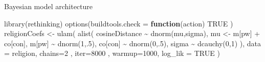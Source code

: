 \documentclass[
  10pt,
  ignorenonframetext,
  x11names, dvipsnames, bibspacing,natbib, table]{beamer}
\newenvironment{Shaded}{\begin{snugshade}}{\end{snugshade}}
\newcommand{\AttributeTok}[1]{\textcolor[rgb]{0.77,0.63,0.00}{#1}}
\newcommand{\ConstantTok}[1]{\textcolor[rgb]{0.00,0.00,0.00}{#1}}
\newcommand{\ControlFlowTok}[1]{\textcolor[rgb]{0.13,0.29,0.53}{\textbf{#1}}}
\newcommand{\DecValTok}[1]{\textcolor[rgb]{0.00,0.00,0.81}{#1}}
\newcommand{\FunctionTok}[1]{\textcolor[rgb]{0.00,0.00,0.00}{#1}}
\newcommand{\NormalTok}[1]{#1}
\newcommand{\OtherTok}[1]{\textcolor[rgb]{0.56,0.35,0.01}{#1}}
\newcommand{\SpecialCharTok}[1]{\textcolor[rgb]{0.00,0.00,0.00}{#1}}
\begin{document}
\begin{frame}[fragile]{Bayesian model architecture}
\protect\hypertarget{bayesian-model-architecture-1}{}
\vspace{1mm}
\footnotesize

\begin{Shaded}
\begin{Highlighting}[]
\FunctionTok{library}\NormalTok{(rethinking)}
\FunctionTok{options}\NormalTok{(}\AttributeTok{buildtools.check =} \ControlFlowTok{function}\NormalTok{(action) }\ConstantTok{TRUE}\NormalTok{ )}
\NormalTok{religionCoefs }\OtherTok{\textless{}{-}} \FunctionTok{ulam}\NormalTok{(}
  \FunctionTok{alist}\NormalTok{(}
\NormalTok{    cosineDistance }\SpecialCharTok{\textasciitilde{}} \FunctionTok{dnorm}\NormalTok{(mu,sigma),}
\NormalTok{    mu }\OtherTok{\textless{}{-}}\NormalTok{ m[pw] }\SpecialCharTok{+}\NormalTok{ co[con],}
\NormalTok{    m[pw] }\SpecialCharTok{\textasciitilde{}} \FunctionTok{dnorm}\NormalTok{(}\DecValTok{1}\NormalTok{,.}\DecValTok{5}\NormalTok{),}
\NormalTok{    co[con] }\SpecialCharTok{\textasciitilde{}} \FunctionTok{dnorm}\NormalTok{(}\DecValTok{0}\NormalTok{,.}\DecValTok{5}\NormalTok{),}
\NormalTok{    sigma }\SpecialCharTok{\textasciitilde{}} \FunctionTok{dcauchy}\NormalTok{(}\DecValTok{0}\NormalTok{,}\DecValTok{1}\NormalTok{)}
\NormalTok{  ),}
  \AttributeTok{data =}\NormalTok{ religion,}
  \AttributeTok{chains=}\DecValTok{2}\NormalTok{ , }\AttributeTok{iter=}\DecValTok{8000}\NormalTok{ , }\AttributeTok{warmup=}\DecValTok{1000}\NormalTok{, }
  \AttributeTok{log\_lik =} \ConstantTok{TRUE}
\NormalTok{)}
\end{Highlighting}
\end{Shaded}

\normalsize
\end{frame}
\end{document}
